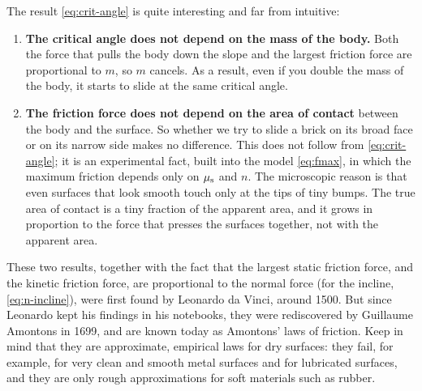 \documentclass[11pt,a4paper]{article}
\begin{document}
The result \eqref{eq:crit-angle} is quite interesting and far from intuitive:
\begin{enumerate}
  \item \textbf{The critical angle does not depend on the mass of the body.} Both the force that
    pulls the body down the slope and the largest friction force are proportional to $m$, so $m$
    cancels. As a result, even if you double the mass of the body, it starts to slide at the same
    critical angle.
  \item \textbf{The friction force does not depend on the area of contact} between the body and the
    surface. So whether we try to slide a brick on its broad face or on its narrow side makes no
    difference. This does not follow from \eqref{eq:crit-angle}; it is an experimental fact, built into
    the model \eqref{eq:fmax}, in which the maximum friction depends only on $\mu_{\mathrm{s}}$ and $n$. The
    microscopic reason is that even surfaces that look smooth touch only at the tips of tiny bumps. The
    true area of contact is a tiny fraction of the apparent area, and it grows in proportion to the
    force that presses the surfaces together, not with the apparent area.
\end{enumerate}
These two results, together with the fact that the largest static friction force, and the kinetic
friction force, are proportional to the normal force (for the incline, \eqref{eq:n-incline}), were
first found by Leonardo da Vinci, around 1500. But since
Leonardo kept his findings in his notebooks, they were rediscovered by Guillaume Amontons in 1699, and
are known today as Amontons' laws of friction. Keep in mind that they are approximate, empirical laws
for dry surfaces: they fail, for example, for very clean and smooth metal surfaces and for lubricated
surfaces, and they are only rough approximations for soft materials such as rubber.
\end{document}
